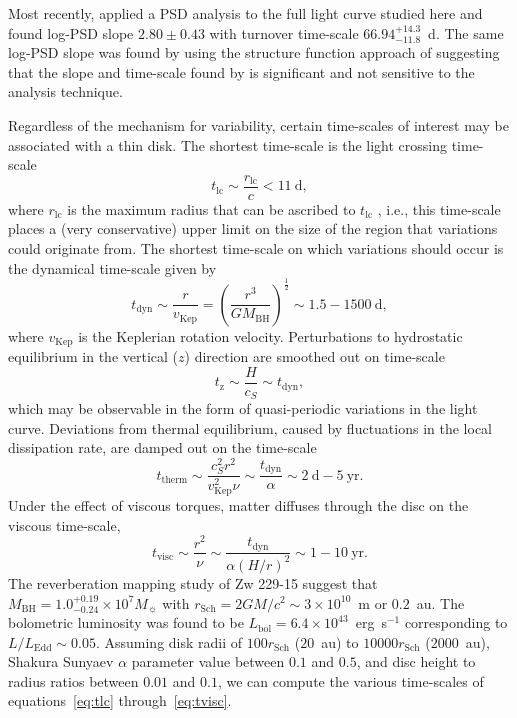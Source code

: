 \documentclass[a4paper,fleqn,usenatbib]{mnras}
\begin{document}
Most recently, \citet{CariniWilliamsAAS} applied a PSD analysis to the full light curve studied here and found log-PSD slope $2.80 \pm 0.43$ with turnover time-scale $66.94^{+14.3}_{-11.8}$~d. The same log-PSD slope was found by \citet{Kasliwal15b} using the structure function approach of \citet{Kasliwal15} suggesting that the slope and time-scale found by \citet{CariniWilliamsAAS} is significant and not sensitive to the analysis technique.

Regardless of the mechanism for variability, certain time-scales of interest may be associated with a thin disk. The shortest time-scale is the light crossing time-scale
\begin{equation}\label{eq:tlc}
t_{\mathrm{lc}} \sim \frac{r_{\mathrm{lc}}}{c} < 11~\text{d},
\end{equation}
where $r_{\mathrm{lc}}$ is the maximum radius that can be ascribed to $t_{\mathrm{lc}}$ \citep{Peterson}, i.e., this time-scale places a (very conservative) upper limit on the size of the region that variations could originate from. The shortest time-scale on which variations should occur is the dynamical time-scale given by
\begin{equation}\label{eq:tdyn}
t_{\mathrm{dyn}} \sim \frac{r}{v_{\mathrm{Kep}}} = \left( \frac{r^{3}}{GM_{\mathrm{BH}}} \right)^{\frac{1}{2}} \sim 1.5 - 1500~\text{d},
\end{equation}
where $v_{\mathrm{Kep}}$ is the Keplerian rotation velocity. Perturbations to hydrostatic equilibrium in the vertical ($z$) direction are smoothed out on time-scale
\begin{equation}\label{eq:tz}
t_{\mathrm{z}} \sim \frac{H}{c_{S}} \sim t_{\mathrm{dyn}},
\end{equation}
which may be observable in the form of quasi-periodic variations in the light curve. Deviations from thermal equilibrium, caused by fluctuations in the local dissipation rate, are damped out on the time-scale
\begin{equation}\label{eq:ttherm}
t_{\mathrm{therm}} \sim \frac{c_{S}^{2}r^{2}}{v_{\mathrm{Kep}}^{2} \nu} \sim \frac{t_{\mathrm{dyn}}}{\alpha}  \sim 2~\text{d} - 5~\text{yr}.
\end{equation}
Under the effect of viscous torques, matter diffuses through the disc on the viscous time-scale,  
\begin{equation}\label{eq:tvisc}
t_{\mathrm{visc}} \sim \frac{r^{2}}{\nu} \sim \frac{t_{\mathrm{dyn}}}{\alpha (H/r)^{2}} \sim 1 - 10~\text{yr}.
\end{equation}
The \citet{Barth11} reverberation mapping study of Zw 229-15 suggest that $M_{\mathrm{BH}} = 1.0^{+0.19}_{-0.24} \times 10^{7} M_{\sun}$ with $r_{\mathrm{Sch}} = 2GM/c^{2} \sim 3 \times 10^{10}$~m or $0.2$~au. The bolometric luminosity was found to be $L_{\mathrm{bol}} = 6.4 \times 10^{43}$~erg~s$^{-1}$ corresponding to $L / L_{\mathrm{Edd}} \sim 0.05$. Assuming disk radii of $100 r_{\mathrm{Sch}}$ ($20$~au) to $10000 r_{\mathrm{{Sch}}}$ ($2000$~au), Shakura Sunyaev $\alpha$ parameter value between $0.1$ and $0.5$, and disc height to radius ratios between $0.01$ and $0.1$, we can compute the various time-scales of equations~\eqref{eq:tlc} through~\eqref{eq:tvisc}. 
\end{document}
